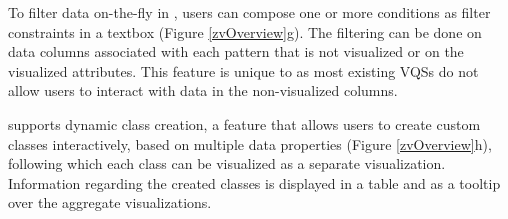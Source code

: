 \enumend
\featurelist
  \item To filter data on-the-fly in \zvpp, users can compose one or more conditions as filter constraints in a textbox (Figure \ref{zvOverview}g). The filtering can be done on data columns associated with each pattern that is not visualized or on the visualized attributes. This feature is unique to \zvpp as most existing VQSs do not allow users to interact with data in the non-visualized columns.
  \item \zvpp supports dynamic class creation, a feature that allows users to create custom classes interactively,
  based on multiple data properties (Figure \ref{zvOverview}h), following which each class can be visualized as a separate visualization. Information regarding the created classes is displayed in a table and as a tooltip over the aggregate visualizations.
\enumend
%
